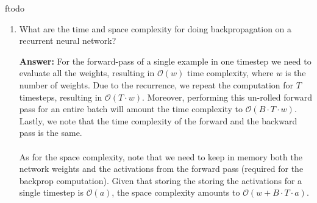 ƒtodo\documentclass{article}
\newenvironment{QandA}{\begin{enumerate}[label=\arabic*.]}{\end{enumerate}}
\newenvironment{answer}{\par\normalfont \textbf{Answer:}}{}
\begin{document}
\begin{QandA}
\begin{answer}
        (Source: \href{https://ai.stackexchange.com/questions/15986/what-are-examples-of-promising-ai-ml-techniques-that-are-computationally-intract}{StackExchange})
    \end{answer}

    \item What are the time and space complexity for doing backpropagation on a recurrent neural network?
    \begin{answer}
        For the forward-pass of a single example in one timestep we need to evaluate all the weights, resulting in $\mathcal{O}(w)$ time complexity, where $w$ is the number of weights. Due to the recurrence, we repeat the computation for $T$ timesteps, resulting in $\mathcal{O}(T \cdot w)$. Moreover, performing this un-rolled forward pass for an entire batch will amount the time complexity to $\mathcal{O}(B \cdot T \cdot w)$. Lastly, we note that the time complexity of the forward and the backward pass is the same.\\\\
        As for the space complexity, note that we need to keep in memory both the network weights and the activations from the forward pass (required for the backprop computation). Given that storing the storing the activations for a single timestep is $\mathcal{O}(a)$, the space complexity amounts to $\mathcal{O}(w + B \cdot T \cdot a)$.
    \end{answer}


\end{QandA}
\end{document}
